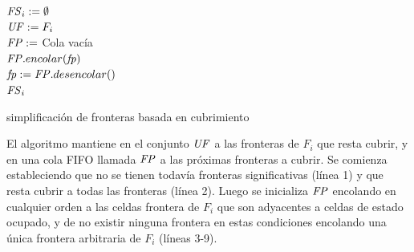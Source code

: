 \begin{algorithm}[H]
\SetAlgoLined

  $\mathit{FS}_i := \emptyset$\\
  $\mathit{UF} := F_i$ \\

  $\mathit{FP} :=$ Cola vacía \\
   {
    $\mathit{FP}.encolar(\mathit{fp})$\\
  }
   {
    $\mathit{fp} := \mathit{FP}.desencolar()$\\
  }
  \Return $\mathit{FS}_i$ 

  \caption{simplificación de fronteras basada en cubrimiento}
  \label{alg:IdObjGeo}
\end{algorithm}


El algoritmo mantiene en el conjunto $\mathit{UF}$ a las fronteras de $F_i$ que
resta cubrir, y en una cola FIFO llamada $\mathit{FP}$ a las próximas fronteras a
cubrir. Se comienza estableciendo que no se tienen todavía fronteras
significativas (línea 1) y  que resta cubrir a todas las fronteras (línea 2).
Luego se inicializa $\mathit{FP}$ encolando en cualquier orden a las celdas
frontera de $F_i$ que son adyacentes a celdas de estado ocupado, y de no
existir ninguna frontera en estas condiciones encolando una única frontera
arbitraria de $F_i$ (líneas 3-9). 

